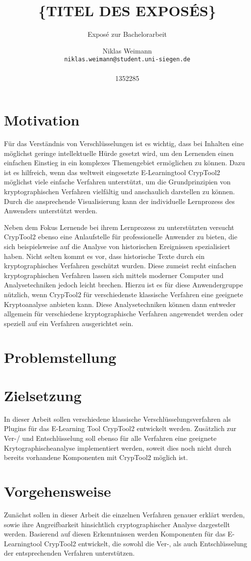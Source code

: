 \documentclass[fontsize=11pt, paper=a4, parskip=half]{scrartcl}
\title{
	\{TITEL DES EXPOSÉS\}
}
\subtitle{Exposé zur 
	Bachelorarbeit
}
\author{
	Niklas Weimann
	\\
	\texttt{niklas.weimann@student.uni-siegen.de}
	\\ \\
	{1352285}
}
\begin{document}
\maketitle

\section{Motivation}
Für das Verständnis von Verschlüsselungen ist es wichtig, dass bei Inhalten eine möglichst geringe intellektuelle Hürde gesetzt wird, um den Lernenden einen einfachen Einstieg in ein komplexes Themengebiet ermöglichen zu können. Dazu ist es hilfreich, wenn das weltweit eingesetzte E-Learningtool CrypTool2 möglichst viele einfache Verfahren unterstützt, um die Grundprinzipien von kryptographischen Verfahren vielfältig und anschaulich darstellen zu können. Durch die ansprechende Visualisierung kann der individuelle Lernprozess des Anwenders unterstützt werden.

Neben dem Fokus Lernende bei ihrem Lernprozess zu unterstützten versucht CrypTool2 ebenso eine Anlaufstelle für professionelle Anwender zu bieten, die sich beispielsweise auf die Analyse von historischen Ereignissen spezialisiert haben. Nicht selten kommt es vor, dass historische Texte durch ein kryptographisches Verfahren geschützt wurden. Diese zumeist recht einfachen kryptographischen Verfahren lassen sich mittels moderner Computer und Analysetechniken jedoch leicht brechen. Hierzu ist es für diese Anwendergruppe nützlich, wenn CrypTool2 für verschiedenste klassische Verfahren eine geeignete Kryptoanalyse anbieten kann. Diese Analysetechniken können dann entweder allgemein für verschiedene kryptographische Verfahren angewendet werden oder speziell auf ein Verfahren ausgerichtet sein.

\section{Problemstellung}




\section{Zielsetzung}
In dieser Arbeit sollen verschiedene klassische Verschlüsselungsverfahren als Plugins für das E-Learning Tool CrypTool2 entwickelt werden. Zusätzlich zur Ver-/ und Entschlüsselung soll ebenso für alle Verfahren eine geeignete Krytographischeanalyse implementiert werden, soweit dies noch nicht durch bereits vorhandene Komponenten mit CrypTool2 möglich ist. 

\section{Vorgehensweise}
Zunächst sollen in dieser Arbeit die einzelnen Verfahren genauer erklärt werden, sowie ihre Angreifbarkeit hinsichtlich cryptographischer Analyse dargestellt werden. Basierend auf diesen Erkenntnissen werden Komponenten für das E-Learningtool CrypTool2 entwickelt, die sowohl die Ver-, als auch Entschlüsselung der entsprechenden Verfahren unterstützen.

\pagebreak



\end{document}
